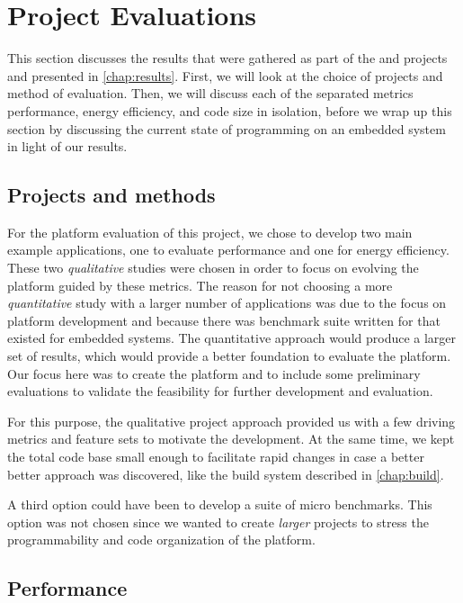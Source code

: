 
\section{Project Evaluations}
\label{sec:disc:project_evaluations}

This section discusses the results that were gathered as part of the {\tracker} and {\cg} projects and presented in \autoref{chap:results}.
First, we will look at the choice of projects and method of evaluation.
Then, we will discuss each of the separated metrics performance, energy efficiency, and code size in isolation, before we wrap up this section by discussing the current state of {\rust} programming on an embedded system in light of our results.

\subsection{Projects and methods}

For the platform evaluation of this project, we chose to develop two main example applications, one to evaluate performance and one for energy efficiency.
These two \emph{qualitative} studies were chosen in order to focus on evolving the platform guided by these metrics.
The reason for not choosing a more \emph{quantitative} study with a larger number of applications was due to the focus on platform development and because there was benchmark suite written for {\rust} that existed for embedded systems.
The quantitative approach would produce a larger set of results, which would provide a better foundation to evaluate the platform.
Our focus here was to create the platform and to include some preliminary evaluations to validate the feasibility for further development and evaluation.

For this purpose, the qualitative project approach provided us with a few driving metrics and feature sets to motivate the development.
At the same time, we kept the total code base small enough to facilitate rapid changes in case a better better approach was discovered, like the build system described in \autoref{chap:build}.

A third option could have been to develop a suite of micro benchmarks.
This option was not chosen since we wanted to create \emph{larger} projects to stress the programmability and code organization of the platform.

\subsection{Performance}

